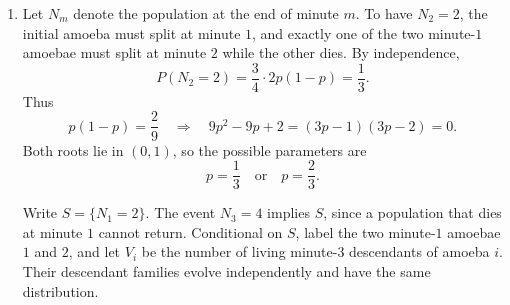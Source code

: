 \documentclass[11pt,a4paper]{article}
\newcommand{\Prob}{P}
\begin{document}
\begin{enumerate}
We next calculate extinction by minute $2$, starting with one amoeba
at time $0$ and applying the odd-minute rule first. Extinction occurs
either when the original amoeba dies at minute $1$, or when it splits
at minute $1$ and both descendants die at minute $2$. These cases are
disjoint. By the law of total probability and independence, the
alternating model gives
\[
\Prob(\text{extinction by minute }2)
=\frac14+\frac34\left(\frac23\right)^2
=\frac14+\frac13
=\boxed{\frac7{12}}.
\]
In the averaged model, the death probability at each minute is
$\bar p=11/24$. Applying the same two-case calculation,
\[
\begin{aligned}
\Prob_{\mathrm{avg}}(\text{extinction by minute }2)
&=\bar p+(1-\bar p)\bar p^2\\
&=\frac{11}{24}+\frac{13}{24}\left(\frac{11}{24}\right)^2
=\boxed{\frac{7909}{13824}}.
\end{aligned}
\]
Since
\[
\frac7{12}-\frac{7909}{13824}
=\frac{8064-7909}{13824}
=\frac{155}{13824}>0,
\]
averaging \emph{underestimates} extinction by minute $2$.
For eventual extinction, the averaged probability is given as $11/13$,
whereas the alternating model has probability $x=1$. Therefore,
\[
\frac{11}{13}<1,
\]
so averaging also \emph{underestimates} eventual extinction.

\item Let $N_m$ denote the population at the end of minute $m$.
To have $N_2=2$, the initial amoeba must split at minute $1$, and exactly
one of the two minute-$1$ amoebae must split at minute $2$ while the
other dies. By independence,
\[
\Prob(N_2=2)=\frac34\cdot2p(1-p)=\frac13.
\]
Thus
\[
p(1-p)=\frac29
\quad\Longrightarrow\quad
9p^2-9p+2=(3p-1)(3p-2)=0.
\]
Both roots lie in $(0,1)$, so the possible parameters are
\[
\boxed{p=\frac13\quad\text{or}\quad p=\frac23}.
\]

Write $S=\{N_1=2\}$. The event $N_3=4$ implies $S$, since a population
that dies at minute $1$ cannot return. Conditional on $S$, label the
two minute-$1$ amoebae $1$ and $2$, and let $V_i$ be the number of
living minute-$3$ descendants of amoeba $i$. Their descendant families
evolve independently and have the same distribution.


\end{enumerate}
\end{document}
